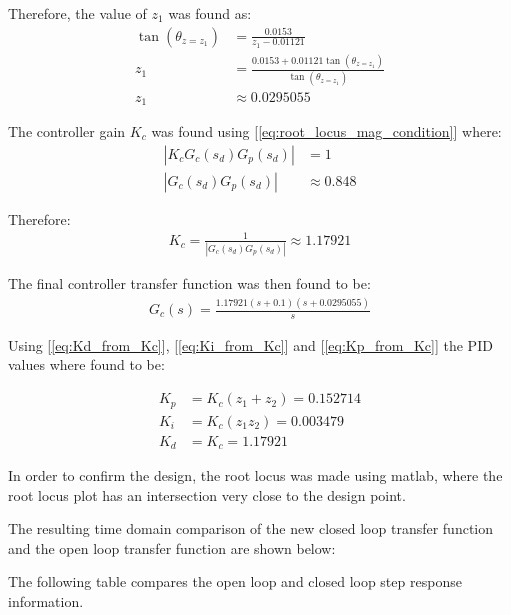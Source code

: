 Therefore, the value of $z_1$ was found as:
\begin{align*}
    \tan(\theta_{z=z_1}) &= \frac{0.0153}{z_1 - 0.01121} \\
    z_1 &= \frac{0.0153 + 0.01121 \tan(\theta_{z=z_1})}{\tan(\theta_{z=z_1})} \\
    z_1 &\approx 0.0295055
\end{align*}

The controller gain $K_c$ was found using [\ref{eq:root_locus_mag_condition}] where:
\begin{align*}
    |K_c G_c(s_d)G_p(s_d)| &= 1\\
    |G_c(s_d)G_p(s_d)| &\approx 0.848
\end{align*}

Therefore:
\begin{align*}
    K_c = \frac{1}{|G_c(s_d)G_p(s_d)|} \approx 1.17921
\end{align*}

The final controller transfer function was then found to be:
\begin{align*}
    G_c(s) = \frac{1.17921 (s + 0.1)(s+0.0295055)}{s}
\end{align*}

Using [\ref{eq:Kd_from_Kc}], [\ref{eq:Ki_from_Kc}] and [\ref{eq:Kp_from_Kc}] the PID values where found to be:

\begin{align*}
    K_p &= K_c (z_1 + z_2) = 0.152714 \\
    K_i &= K_c (z_1 z_2) = 0.003479 \\
    K_d &= K_c = 1.17921
\end{align*}

In order to confirm the design, the root locus was made using matlab, where the root locus plot has an intersection very close to the design point.

The resulting time domain comparison of the new closed loop transfer function and the open loop transfer function are shown below:


The following table compares the open loop and closed loop step response information.

